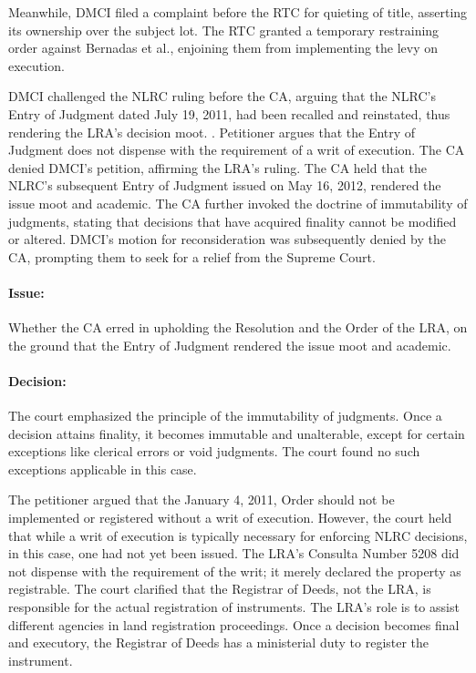 \documentclass[
12pt,
oneside,
onehalfspacing,
headsepline
]{DigestCollection}
\begin{document}
Meanwhile, DMCI filed a complaint before the RTC for quieting of title, asserting its ownership over the subject lot. The RTC granted a temporary restraining order against Bernadas et al., enjoining them from implementing the levy on execution. 

DMCI challenged the NLRC ruling before the CA, arguing that the NLRC's Entry of Judgment dated July 19, 2011, had been recalled and reinstated, thus rendering the LRA's decision moot. . Petitioner argues that the Entry of Judgment does not dispense with the requirement of a writ of execution. The CA denied DMCI's petition, affirming the LRA's ruling. The CA held that the NLRC's subsequent Entry of Judgment issued on May 16, 2012, rendered the issue moot and academic. The CA further invoked the doctrine of immutability of judgments, stating that decisions that have acquired finality cannot be modified or altered. DMCI's motion for reconsideration was subsequently denied by the CA, prompting them to seek for a relief from the Supreme Court.

\paragraph{Issue:}
\label{adb4a2a0-1243-11ef-aa24-9916ea601717}


Whether the CA erred in upholding the Resolution and the Order of the LRA, on the ground that the Entry of Judgment rendered the issue moot and academic. 

\paragraph{Decision:}
\label{af957090-1243-11ef-aa24-9916ea601717}


The court emphasized the principle of the immutability of judgments. Once a decision attains finality, it becomes immutable and unalterable, except for certain exceptions like clerical errors or void judgments. The court found no such exceptions applicable in this case.

The petitioner argued that the January 4, 2011, Order should not be implemented or registered without a writ of execution. However, the court held that while a writ of execution is typically necessary for enforcing NLRC decisions, in this case, one had not yet been issued. The LRA's Consulta Number 5208 did not dispense with the requirement of the writ; it merely declared the property as registrable. The court clarified that the Registrar of Deeds, not the LRA, is responsible for the actual registration of instruments. The LRA's role is to assist different agencies in land registration proceedings. Once a decision becomes final and executory, the Registrar of Deeds has a ministerial duty to register the instrument.
\end{document}
